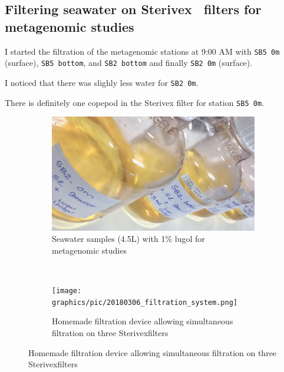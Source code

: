 \subsection{Filtering seawater on Sterivex\texttrademark~ filters for metagenomic studies}
\label{task:20180306_cj0}

I started the filtration of the metagenomic stations at 9:00 AM with \texttt{SB5 0m} (surface), \texttt{SB5 bottom}, and \texttt{SB2 bottom} and finally \texttt{SB2 0m} (surface).

I noticed that there was slighly less water for \texttt{SB2 0m}.





There is definitely one copepod in the Sterivex filter for station \texttt{SB5 0m}.

\begin{figure}[H] %
    \centering
    \caption{Pictures of the filtration process}
    \label{fig:label}
    \begin{subfigure}[b]{0.49\textwidth}
        \includegraphics[width=\textwidth]{graphics/pic/20180306_seawater_samples.png}
        \caption{Seawater samples (4.5L) with 1\% lugol for metagenomic studies}
        \label{sfig:slabel1}
    \end{subfigure}
    ~ 
    \begin{subfigure}[b]{0.49\textwidth}
        \texttt{[image: graphics/pic/20180306\_filtration\_system.png]}
        \caption{Homemade filtration device allowing simultaneous filtration on three Sterivex\texttrademark filters}
        \label{sfig:slabel2}
    \end{subfigure}
\end{figure}